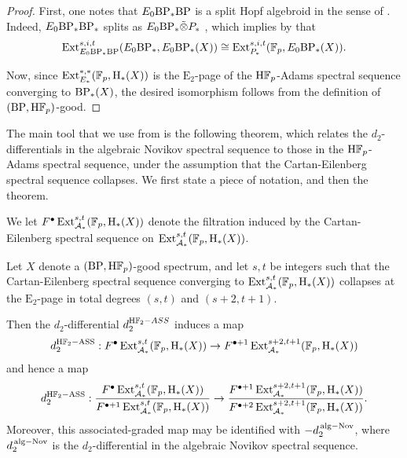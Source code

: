 \begin{proof}
    First, one notes that $E_0 \mathrm{BP}_* \mathrm{BP}$ is a split Hopf algebroid in the sense of \cite[Section 7]{Miller}. Indeed, $E_0 \mathrm{BP}_* \mathrm{BP}_*$ splits as $E_0 \mathrm{BP}_* \tilde{\otimes} P_*$ \cite[p. 305]{Miller}, which implies by \cite[Proposition 7.6]{Miller} that \[\operatorname{\mathrm{Ext}}^{s,i,t} _{E_0 \mathrm{BP}_* \mathrm{BP}} (E_0 \mathrm{BP}_*, E_0 \mathrm{BP}_* (X)) \cong \operatorname{\mathrm{Ext}}^{s,i,t} _{P_*} (\operatorname{\mathbb{F}}_p, E_0 \mathrm{BP}_* (X)).\]

    Now, since $\operatorname{\mathrm{Ext}}_{E_*} ^{*,*} (\operatorname{\mathbb{F}}_p, \mathrm{H}_* (X))$ is the $\mathrm{E}_2$-page of the $\mathrm{H}\mathbb{F}_p$-Adams spectral sequence converging to $\mathrm{BP}_* (X)$, the desired isomorphism follows from the definition of $(\mathrm{BP}, \mathrm{H}\mathbb{F}_p)$-good.
\end{proof}
%

The main tool that we use from \cite{Miller} is the following theorem, which relates the $d_2$-differentials in the algebraic Novikov spectral sequence to those in the $\mathrm{H}\mathbb{F}_p$-Adams spectral sequence, under the assumption that the Cartan-Eilenberg spectral sequence collapses. We first state a piece of notation, and then the theorem.

\begin{ntn}
    We let $F^{\bullet} \operatorname{\mathrm{Ext}}^{s,t} _{\operatorname{\mathcal{A}}_*} (\operatorname{\mathbb{F}}_p, \mathrm{H}_* (X))$ denote the filtration induced by the Cartan-Eilenberg spectral sequence on $\operatorname{\mathrm{Ext}}^{s,t} _{\operatorname{\mathcal{A}}_*} (\operatorname{\mathbb{F}}_p, \mathrm{H}_* (X))$.
\end{ntn}

\begin{thm}\label{thm:Miller-thm} 
    Let $X$ denote a $(\mathrm{BP}, \mathrm{H}\mathbb{F}_p)$-good spectrum, and let $s,t$ be integers such that the Cartan-Eilenberg spectral sequence converging to $\operatorname{\mathrm{Ext}}^{s,t}_{\operatorname{\mathcal{A}}_*} (\operatorname{\mathbb{F}}_p, \mathrm{H}_* (X))$ collapses at the $\mathrm{E}_2$-page in total degrees $(s,t)$ and $(s+2,t+1)$.

    Then the $d_2$-differential $d_2 ^{\mathrm{H}\mathbb{F}_2-ASS}$ induces a map
    \[d_2 ^{\mathrm{H}\mathbb{F}_2-\mathrm{ASS}} : F^\bullet \operatorname{\mathrm{Ext}}^{s,t}_{\operatorname{\mathcal{A}}_*} (\operatorname{\mathbb{F}}_p, \mathrm{H}_* (X)) \to F^{\bullet+1} \operatorname{\mathrm{Ext}}^{s+2,t+1}_{\operatorname{\mathcal{A}}_*} (\operatorname{\mathbb{F}}_p, \mathrm{H}_* (X)) \]
    and hence a map
    \[d_2 ^{\mathrm{H}\mathbb{F}_2-\mathrm{ASS}} : \frac{F^\bullet \operatorname{\mathrm{Ext}}^{s,t}_{\operatorname{\mathcal{A}}_*} (\operatorname{\mathbb{F}}_p, \mathrm{H}_* (X))}{F^{\bullet+1} \operatorname{\mathrm{Ext}}^{s,t}_{\operatorname{\mathcal{A}}_*} (\operatorname{\mathbb{F}}_p, \mathrm{H}_* (X))} \to \frac{F^{\bullet+1} \operatorname{\mathrm{Ext}}^{s+2,t+1}_{\operatorname{\mathcal{A}}_*} (\operatorname{\mathbb{F}}_p, \mathrm{H}_* (X))}{F^{\bullet+2} \operatorname{\mathrm{Ext}}^{s+2,t+1}_{\operatorname{\mathcal{A}}_*} (\operatorname{\mathbb{F}}_p, \mathrm{H}_* (X))}. \]
    Moreover, this associated-graded map may be identified with $-d_2 ^{\hspace{0.05cm}\mathrm{alg-Nov}}$, where $d_2 ^{\hspace{0.05cm}\mathrm{alg-Nov}}$ is the $d_2$-differential in the algebraic Novikov spectral sequence.
\end{thm}

